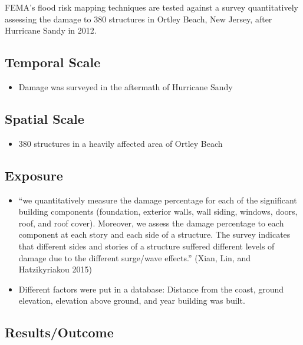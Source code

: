 \documentclass[
]{article}
\providecommand{\tightlist}{%
  \setlength{\itemsep}{0pt}\setlength{\parskip}{0pt}}
\begin{document}
FEMA's flood risk mapping techniques are tested against a survey
quantitatively assessing the damage to 380 structures in Ortley Beach,
New Jersey, after Hurricane Sandy in 2012.

\hypertarget{temporal-scale-23}{%
\subsection{Temporal Scale}\label{temporal-scale-23}}

\begin{itemize}
\tightlist
\item
  Damage was surveyed in the aftermath of Hurricane Sandy
\end{itemize}

\hypertarget{spatial-scale-23}{%
\subsection{Spatial Scale}\label{spatial-scale-23}}

\begin{itemize}
\tightlist
\item
  380 structures in a heavily affected area of Ortley Beach
\end{itemize}

\hypertarget{exposure-22}{%
\subsection{Exposure}\label{exposure-22}}

\begin{itemize}
\tightlist
\item
  ``we quantitatively measure the damage percentage for each of the
  significant building components (foundation, exterior walls, wall
  siding, windows, doors, roof, and roof cover). Moreover, we assess the
  damage percentage to each component at each story and each side of a
  structure. The survey indicates that different sides and stories of a
  structure suffered different levels of damage due to the different
  surge/wave effects.'' (Xian, Lin, and Hatzikyriakou 2015)
\item
  Different factors were put in a database: Distance from the coast,
  ground elevation, elevation above ground, and year building was built.
\end{itemize}

\hypertarget{resultsoutcome-4}{%
\subsection{Results/Outcome}\label{resultsoutcome-4}}
\end{document}
